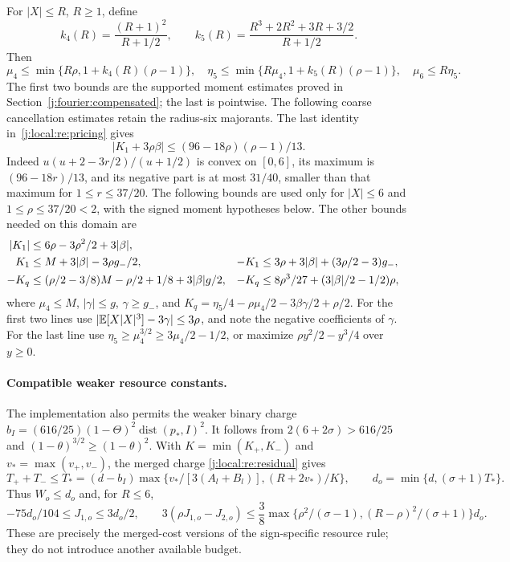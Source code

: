 For $|X|\le R$, $R\ge1$, define
\[
 k_4(R)=\frac{(R+1)^2}{R+1/2},\qquad
 k_5(R)=\frac{R^3+2R^2+3R+3/2}{R+1/2}.
\]
Then
\begin{equation}\label{j:local:mom:universal-moments}
 \mu_4\le\min\{R\rho,1+k_4(R)(\rho-1)\},\quad
 \eta_5\le\min\{R\mu_4,1+k_5(R)(\rho-1)\},\quad
 \mu_6\le R\eta_5.
\end{equation}
The first two bounds are the supported moment estimates proved in
Section~\ref{j:fourier:compensated}; the last is pointwise.
The following coarse cancellation estimates retain the radius-six majorants.
The last identity in~\eqref{j:local:re:pricing} gives
\begin{equation}\label{j:local:mom:K-cancellation}
 |K_1+3\rho\beta|\le(96-18\rho)(\rho-1)/13.
\end{equation}
Indeed $u(u+2-3r/2)/(u+1/2)$ is convex on $[0,6]$, its maximum is
$(96-18r)/13$, and its negative part is at most $31/40$, smaller than that
maximum for $1\le r\le37/20$.
The following bounds are used only for $|X|\le6$ and
$1\le\rho\le37/20<2$, with the signed moment hypotheses below.
The other bounds needed on this domain are
\begin{align}
 |K_1|&\le6\rho-3\rho^2/2+3|\beta|,\notag\\
 K_1&\le M+3|\beta|-3\rho g_-/2,&
 -K_1&\le3\rho+3|\beta|+(3\rho/2-3)g_-,\notag\\
 -K_q&\le(\rho/2-3/8)M-\rho/2+1/8+3|\beta|g/2,&
 -K_q&\le8\rho^3/27+(3|\beta|/2-1/2)\rho,               \label{j:local:mom:K-bounds}
\end{align}
where $\mu_4\le M$, $|\gamma|\le g$, $\gamma\ge g_-$, and
$K_q=\eta_5/4-\rho\mu_4/2-3\beta\gamma/2+\rho/2$.
For the first two lines use
$|\mathbb E[X|X|^3]-3\gamma|\le3\rho$, and note the negative coefficients
of $\gamma$. For the last line use
$\eta_5\ge\mu_4^{3/2}\ge3\mu_4/2-1/2$, or maximize
$\rho y^2/2-y^3/4$ over $y\ge0$.


\paragraph{Compatible weaker resource constants.}
The implementation also permits the weaker binary charge
$b_I=(616/25)(1-\Theta)^2\operatorname{dist}(p_*,I)^2$.
It follows from $2(6+2\sigma)>616/25$ and
$(1-\theta)^{3/2}\ge(1-\theta)^2$.
With $K=\min(K_+,K_-)$ and $v_* =\max(v_+,v_-)$, the merged charge
\eqref{j:local:re:residual} gives
\[
 T_++T_-\le T_*=(d-b_I)\max\{v_*/[3(A_l+B_l)],(R+2v_*)/K\},
 \qquad d_o=\min\{d,(\sigma+1)T_*\}.
\]
Thus $W_o\le d_o$ and, for $R\le6$,
\[
 -75d_o/104\le J_{1,o}\le3d_o/2,\qquad
 3(\rho J_{1,o}-J_{2,o})\le\frac38
 \max\{\rho^2/(\sigma-1),(R-\rho)^2/(\sigma+1)\}d_o.
\]
These are precisely the merged-cost versions of the sign-specific
resource rule; they do not introduce another available budget.

